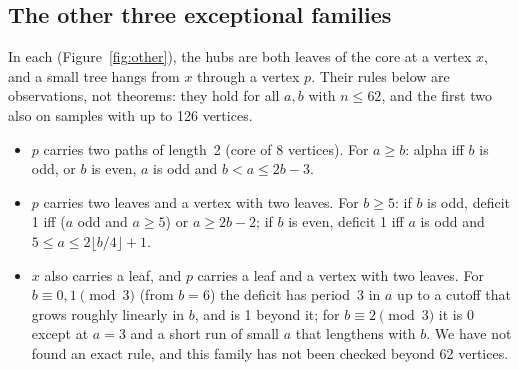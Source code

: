 \documentclass[11pt]{amsart}
\theoremstyle{definition}
\begin{document}
\subsection*{The other three exceptional families}
In each (Figure~\ref{fig:other}), the hubs are both leaves of the core at a vertex $x$, and a small tree hangs from
$x$ through a vertex $p$.
Their rules below are observations, not theorems: they hold for all $a,b$ with $n\le 62$, and the first two
also on samples with up to 126 vertices.
\begin{itemize}
\item[(a)] $p$ carries two paths of length~2 (core of 8 vertices). For $a\ge b$: alpha iff $b$ is odd, or $b$ is even,
  $a$ is odd and $b<a\le 2b-3$.
\item[(b)] $p$ carries two leaves and a vertex with two leaves. For $b\ge 5$: if $b$ is odd, deficit 1 iff ($a$ odd and
  $a\ge5$) or $a\ge 2b-2$; if $b$ is even, deficit 1 iff $a$ is odd and $5\le a\le 2\lfloor b/4\rfloor+1$.
\item[(c)] $x$ also carries a leaf, and $p$ carries a leaf and a vertex with two leaves. For $b\equiv 0,1\pmod 3$
  (from $b=6$) the deficit has period~3 in $a$ up to a cutoff that grows roughly linearly in $b$, and is 1 beyond
  it; for $b\equiv 2\pmod 3$ it is 0 except at $a=3$ and a short run of small $a$ that lengthens with $b$. We
  have not found an exact rule, and this family has not been checked beyond 62 vertices.
\end{itemize}
\end{document}

